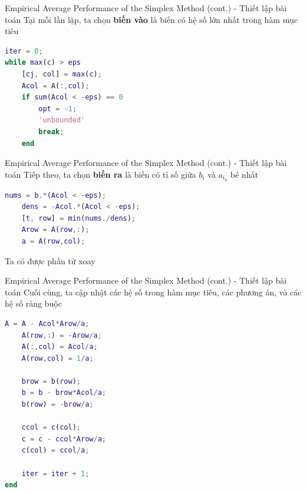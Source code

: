 \documentclass[10pt]{beamer}
\begin{document}
\begin{frame}[fragile]{Empirical Average Performance of the Simplex Method (cont.) - Thiết lập bài toán}
Tại mỗi lần lặp, ta chọn \textbf{biến vào} là biến có hệ số lớn nhất trong hàm mục tiêu
\begin{lstlisting}[language=Matlab]
iter = 0;
while max(c) > eps
    [cj, col] = max(c);
    Acol = A(:,col);
    if sum(Acol < -eps) == 0
        opt = -1;
        'unbounded'
        break;
    end
\end{lstlisting}
\end{frame}

\begin{frame}[fragile]{Empirical Average Performance of the Simplex Method (cont.) - Thiết lập bài toán}
Tiếp theo, ta chọn \textbf{biến ra} là biến có tỉ số giữa $b_i$ và $a_{i_k}$ bé nhất
\begin{lstlisting}[language=Matlab]
    nums = b.*(Acol < -eps);
    dens = -Acol.*(Acol < -eps);
    [t, row] = min(nums./dens);
    Arow = A(row,:);
    a = A(row,col);
\end{lstlisting}
Ta có được phần tử xoay
\end{frame}

\begin{frame}[fragile]{Empirical Average Performance of the Simplex Method (cont.) - Thiết lập bài toán}
Cuối cùng, ta cập nhật các hệ số trong hàm mục tiêu, các phương án, và các hệ số ràng buộc
\begin{lstlisting}[language=Matlab]
    A = A - Acol*Arow/a;
    A(row,:) = -Arow/a;
    A(:,col) = Acol/a;
    A(row,col) = 1/a;
    
    brow = b(row);
    b = b - brow*Acol/a;
    b(row) = -brow/a;
    
    ccol = c(col);
    c = c - ccol*Arow/a;
    c(col) = ccol/a;
    
    iter = iter + 1;
end
\end{lstlisting}
\end{frame}
\end{document}
